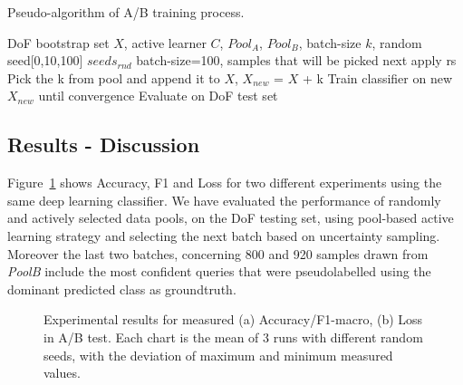 \begin{algorithm}
\caption{Pseudo-algorithm of A/B training process.}
\label{c5:algorithm_ab_training}
\begin{algorithmic}[1]
\Require DoF bootstrap set $X$, active learner $C$, $Pool_{A}$, $Pool_{B}$, batch-size $k$, random seed[0,10,100] $seeds_{rnd}$
    \State batch-size=100, samples that will be picked next
            \State apply rs
            \Repeat
                \State Pick the k from pool and append it to $X$, $X_{new}$ = $X$ + k
                \State Train classifier on new $X_{new}$ until convergence
                \State Evaluate on DoF test set
        \EndFor
    \EndFor
\EndProcedure
\end{algorithmic}
\end{algorithm}


\subsection{Results - Discussion}

Figure~\ref{c5:figure_ab_test_results} shows Accuracy, F1 and Loss for two different experiments using the same deep learning classifier. We have evaluated the performance of randomly and actively selected data pools, on the DoF testing set, using pool-based active learning strategy and selecting the next batch based on uncertainty sampling. 
Moreover the last two batches, concerning 800 and 920 samples drawn from \textit{PoolB} include the most confident queries that were pseudolabelled using the dominant predicted class as groundtruth.

\begin{figure}[ht!]
    \centering  
    \caption{Experimental results for measured (a) Accuracy/F1-macro, (b) Loss in A/B test. Each chart is the mean of 3 runs with different random seeds, with the deviation of maximum and minimum measured values.}
    \label{c5:figure_ab_test_results}
\end{figure}

